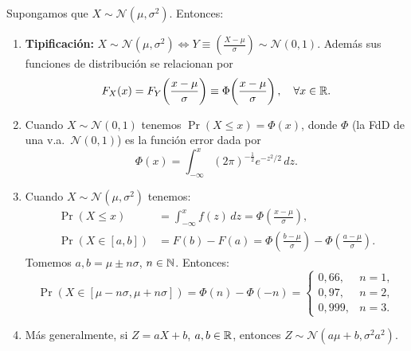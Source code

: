 \begin{proposicion}[58]
Supongamos que $X \sim \mathcal{N}(\mu, \sigma^2)$. Entonces:
\begin{enumerate}
        \item   \textcolor{azulresalt}{\textbf{Tipificación:} $X \sim \mathcal{N}(\mu, \sigma^2) \Leftrightarrow Y \equiv \left(\frac{X-\mu}{\sigma}\right) \sim \mathcal{N}(0,1)$.
        Además sus funciones de distribución se relacionan por
        \[
          F_X(x) = F_Y\!\left(\frac{x-\mu}{\sigma}\right) \equiv \Phi\!\left(\frac{x-\mu}{\sigma}\right), \quad \forall x \in \mathbb{R}.
        \]}
  \item Cuando $X \sim \mathcal{N}(0,1)$ tenemos $\Pr(X \le x) = \Phi(x)$, donde $\Phi$ (la FdD de una v.a.\ $\mathcal{N}(0,1)$) es la función error dada por
        \[
          \Phi(x) = \int_{-\infty}^{x} (2\pi)^{-\frac{1}{2}} e^{-z^2/2}\,dz.
        \]
  \item Cuando $X \sim \mathcal{N}(\mu, \sigma^2)$ tenemos:
        \begin{align*}
          \Pr(X \le x) &= \int_{-\infty}^{x} f(z)\,dz = \Phi\!\left(\frac{x-\mu}{\sigma}\right), \\
          \Pr(X \in [a,b]) &= F(b) - F(a) = \Phi\!\left(\frac{b-\mu}{\sigma}\right) - \Phi\!\left(\frac{a-\mu}{\sigma}\right).
        \end{align*}
        Tomemos $a, b = \mu \pm n\sigma$, $n \in \mathbb{N}$. Entonces:
        \[
          \Pr(X \in [\mu - n\sigma, \mu + n\sigma]) = \Phi(n) - \Phi(-n) =
          \begin{cases}
            0{,}66, & n = 1, \\
            0{,}97, & n = 2, \\
            0{,}999, & n = 3.
          \end{cases}
        \]
  \item Más generalmente, si $Z = aX + b$, $a, b \in \mathbb{R}$, entonces $Z \sim \mathcal{N}(a\mu + b, \sigma^2 a^2)$.
\end{enumerate}
\end{proposicion}

